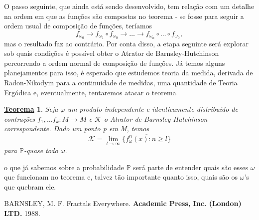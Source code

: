 \documentclass{article}
\newtheorem*{theorem*}{\underline{Teorema}}
\theoremstyle{definition}
\begin{document}
O passo seguinte, que ainda está sendo desenvolvido, tem relação com um detalhe na ordem em que as funções são compostas no teorema - se fosse para seguir a ordem
usual de composição de funções, teríamos
\[
	f_{\omega_{0}}\rightarrow f_{\omega_{1}}\circ f_{\omega_{0}}\rightarrow \dotsc \rightarrow f_{\omega_{n}}\circ \dotsc \circ f_{\omega_{0}},
\]
mas o resultado faz ao contrário. Por conta disso, a etapa seguinte será explorar sob quais condições é possível obter o Atrator de Barnsley-Hutchinson percorrendo a ordem normal
de composição de funções. Já temos alguns planejamentos para isso, é esperado que estudemos teoria da medida, derivada de Radon-Nikodym para a continuidade de medidas, uma quantidade de
Teoria Ergódica e, eventualmente, tentaremos atacar o teorema
\begin{theorem*}
	Seja \(\varphi \) um produto independente e identicamente distribuído de contrações \(f_{1},\dotsc f_{k}:M\rightarrow M\) e \(\mathcal{K}\) o Atrator de Barnsley-Hutchinson correspondente. Dado um
	ponto p em M, temos
	\[
		\mathcal{K}=\lim_{l\to \infty}\overline{\{f_{\omega }^{n}(x): n\geq l\}}
	\]
	para \(\mathbb{P}\)-quase todo \(\omega \).
\end{theorem*}
o que já sabemos sobre a probabilidade \(\mathbb{P}\) será parte de entender quais são esses \(\omega \) que funcionam no teorema e, talvez tão importante quanto isso,
quais são os \(\omega \)'s que quebram ele.
\begin{thebibliography}{99}
	 BARNSLEY, M. F. Fractals Everywhere. \textbf{Academic Press, Inc. (London) LTD.} 1988.
\end{thebibliography}
\end{document}
